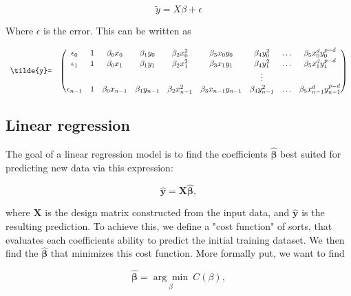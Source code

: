 \begin{equation}
    \tilde{y}=X\beta+\epsilon
\end{equation}

Where $\epsilon$ is the error. This can be written as

\[
\begin{array}{lcccccccc}
  \verb|\tilde{y}=| & \left(\begin{array}{@{}ccccccccc@{}}
    \epsilon_0 & 1 & \beta_0 x_0 &  \beta_1 y_0 &  \beta_2 x_0^2 &  \beta_3 x_0y_0 &  \beta_4 y_0^2 & \ldots &  \beta_5 x_0^d y_0^{p-d}\\
    \epsilon_1 & 1 & \beta_0 x_1 &  \beta_1 y_1 &  \beta_2 x_1^2 &  \beta_3 x_1y_1 &  \beta_4 y_1^2 & \ldots &  \beta_5 x_1^d y_1^{p-d}\\
     & &  &  &  &  & \vdots & \\
    \epsilon_{n-1} & 1 & \beta_0 x_{n-1} & \beta_1 y_{n-1} & \beta_2 x_{n-1}^2 & \beta_3 x_{n-1}y_{n-1} & \beta_4 y_{n-1}^2 & \ldots & \beta_5 x_{n-1}^d y_{n-1}^{p-d}\\
 \end{array}\right) \\[15pt]
\end{array}
\]

\subsection{Linear regression}
The goal of a linear regression model is to find the coefficients $\hat{\mathbf \beta}$ best suited for predicting new data via this expression:

\begin{equation*}
  \hat{\mathbf y} = \mathbf X\hat{\mathbf \beta},
\end{equation*}

where $\mathbf X$ is the design matrix constructed from the input data, and $\hat{\mathbf y}$ is the resulting prediction. To achieve this, we define a "cost function" of sorts, that evaluates each coefficients ability to predict the initial training dataset. We then find the $\hat{\mathbf \beta}$ that minimizes this cost function. More formally put, we want to find

\begin{equation}
  \hat{\mathbf \beta} = \underset{\beta}{\arg \min}\ C(\beta),
\end{equation}

